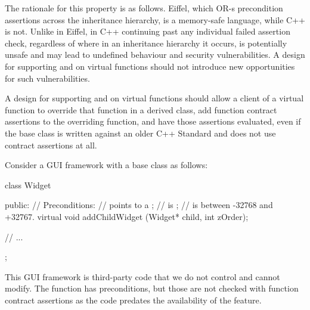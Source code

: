 The rationale for this property is as follows. Eiffel, which OR-s precondition assertions across the inheritance hierarchy, is a memory-safe language, while C++ is not. Unlike in Eiffel, in C++ continuing past any individual failed assertion check, regardless of where in an inheritance hierarchy it occurs, is potentially unsafe and may lead to undefined behaviour and security vulnerabilities. A design for supporting  and  on virtual functions should not introduce new opportunities for such vulnerabilities.



A design for supporting  and  on virtual functions should allow a client of a virtual function to override that function in a derived class, add function contract assertions to the overriding function, and have those assertions evaluated, even if the base class is written against an older C++ Standard and does not use contract assertions at all.

Consider a GUI framework with a  base class as follows:

\begin{codeblock}
class Widget {
public:
  // Preconditions:   
  // \phantom{xxx} points to a ;
  // \phantom{xxx} is ; 
  // \phantom{xxx} is between -32768 and +32767.
  virtual void addChildWidget (Widget* child, int zOrder);
  
// ...
};
\end{codeblock}
This GUI framework is third-party code that we do not control and cannot modify. The function \allowbreak{} has preconditions, but those are not checked with function contract assertions as the code predates the availability of the feature.

